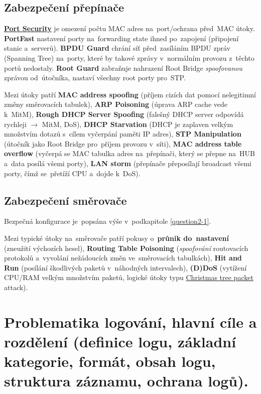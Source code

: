 \subsection{Zabezpečení přepínače}

\textbf{\href{https://en.wikipedia.org/wiki/MAC_filtering}{Port Security}} je omezení počtu MAC adres na~port/ochrana před~MAC útoky. \textbf{PortFast} nastavení porty na~forwarding state ihned po~zapojení (připojení stanic a~serverů). \textbf{BPDU Guard} chrání síť před~zasíláním BPDU zpráv (Spanning Tree) na~porty, které by takové zprávy v~normálním provozu z~těchto portů nedostaly. \textbf{Root Guard} zabraňuje nahrazení Root Bridge \emph{spoofovanou} zprávou od~útočníka, nastaví všechny root porty pro~STP.

Mezi útoky patří \textbf{MAC address spoofing} (příjem cizích dat pomocí nelegitimní změny směrovacích tabulek), \textbf{ARP Poisoning} (úprava ARP cache vede k~MitM), \textbf{Rough DHCP Server Spoofing} (falešný DHCP server odpovídá rychleji $\rightarrow$ MitM, DoS), \textbf{DHCP Starvation} (DHCP je zaplaven velkým množstvím dotazů s~cílem vyčerpání paměti IP adres), \textbf{STP Manipulation} (útočník jako Root Bridge pro~příjem provozu v~síti), \textbf{MAC address table overflow} (vyčerpá se MAC tabulka adres na~přepínači, který se přepne na~HUB a~data posílá všemi porty), \textbf{LAN storm} (přepínače přeposílají broadcast všemi porty, čímž se~přetíží CPU a~dojde k~DoS).

\subsection{Zabezpečení směrovače}

Bezpečná konfigurace je~popsána výše v~podkapitole \ref{question2-1}.

Mezi typické útoky na~směrovače patří pokusy o~\textbf{průnik do~nastavení} (zneužití výchozích hesel), \textbf{Routing Table Poisoning} (\emph{spoofování} routovacích protokolů a~vyvolání nežádoucích změn ve~směrovacích tabulkách), \textbf{Hit and Run} (posílání škodlivých paketů v~náhodných intervalech), \textbf{(D)DoS} (vytížení CPU/RAM velkým množstvím paketů, logické útoky typu \href{https://en.wikipedia.org/wiki/Christmas_tree_packet}{Christmas tree packet} attack).

\clearpage
\section{Problematika logování, hlavní cíle a rozdělení (definice logu, základní kategorie, formát, obsah logu, struktura záznamu, ochrana logů).}

